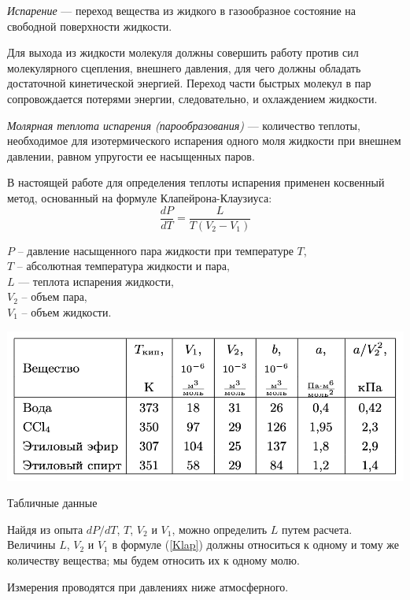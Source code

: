 \documentclass[a4paper,12pt]{article} %
\begin{document}
\textit{Испарение} — переход вещества из жидкого в газообразное состояние 
на свободной поверхности жидкости. 

Для выхода из жидкости молекуля должны совершить работу против сил молекулярного сцепления, 
внешнего давления, для чего должны обладать достаточной кинетической энергией. Переход части 
быстрых молекул в пар сопровождается потерями энергии, следовательно, и охлаждением жидкости.

\textit{Молярная теплота испарения (парообразования)} — количество теплоты, необходимое для 
изотермического испарения одного моля жидкости при внешнем давлении, равном упругости ее насыщенных паров.
    
В настоящей работе для определения теплоты испарения применен косвенный метод, 
основанный на формуле Клапейрона-Клаузиуса:
\begin{equation}
    \label{Klap}
    \frac{dP}{dT} = \frac{L}{T(V_2 - V_1)}
\end{equation}

\noindent $P$ -- давление насыщенного пара жидкости при температуре $T$,\\ 
$T$ -- абсолютная температура жидкости и пара,\\ 
$L$ — теплота испарения жидкости,\\ 
$V_2$ -- объем пара,\\ 
$V_1$ -- объем жидкости.

\begin{table}[h]
  \centering
  \includegraphics[scale = 0.55]{table_data.png}
  \caption{Табличные данные}
  \label{fig:table_data}
\end{table}

Найдя из опыта $dP/dT$, $T$, $V_2$ и $V_1$, можно определить $L$ путем расчета. 
Величины $L$, $V_2$ и $V_1$ в формуле (\ref{Klap}) должны относиться к одному и 
тому же количеству вещества; мы будем относить их к одному молю.

Измерения проводятся при давлениях ниже атмосферного.
\end{document}
